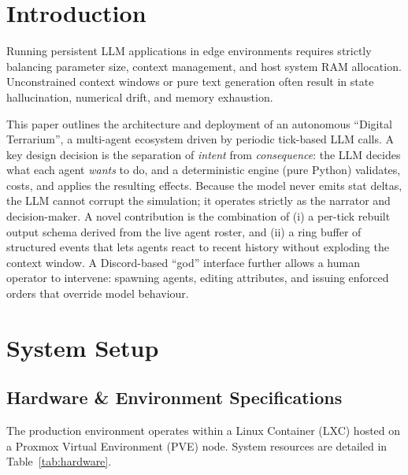 \documentclass[10pt,a4paper]{article}
\begin{document}
\section{Introduction}
Running persistent LLM applications in edge environments requires strictly balancing parameter size, context management, and host system RAM allocation. Unconstrained context windows or pure text generation often result in state hallucination, numerical drift, and memory exhaustion.

This paper outlines the architecture and deployment of an autonomous ``Digital Terrarium'', a multi-agent ecosystem driven by periodic tick-based LLM calls. A key design decision is the separation of \emph{intent} from \emph{consequence}: the LLM decides what each agent \emph{wants} to do, and a deterministic engine (pure Python) validates, costs, and applies the resulting effects. Because the model never emits stat deltas, the LLM cannot corrupt the simulation; it operates strictly as the narrator and decision-maker. A novel contribution is the combination of (i) a per-tick rebuilt output schema derived from the live agent roster, and (ii) a ring buffer of structured events that lets agents react to recent history without exploding the context window. A Discord-based ``god'' interface further allows a human operator to intervene: spawning agents, editing attributes, and issuing enforced orders that override model behaviour.

\section{System Setup}

\subsection{Hardware \& Environment Specifications}
The production environment operates within a Linux Container (LXC) hosted on a Proxmox Virtual Environment (PVE) node. System resources are detailed in Table~\ref{tab:hardware}.
\end{document}
